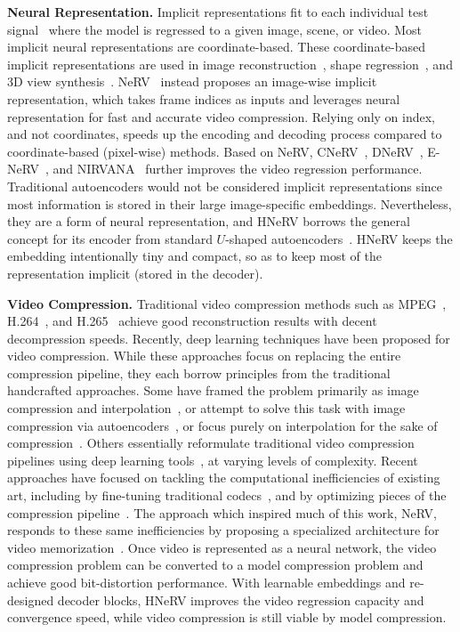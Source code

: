 \documentclass[10pt,twocolumn,letterpaper]{article}
\begin{document}
\noindent\textbf{Neural Representation.}
Implicit representations fit to each individual test signal~\cite{mehta2021modulated} where the model is regressed to a given image, scene, or video.
Most implicit neural representations are coordinate-based.
These coordinate-based implicit representations are used in image reconstruction~\cite{tancik2020fourier,sitzmann2020implicit}, shape regression~\cite{Chen_2019_CVPR,Park_2019_CVPR}, and 3D view synthesis~\cite{mildenhall2020nerf,schwarz2021graf}.
NeRV~\cite{chen2021nerv} instead proposes an image-wise implicit representation, which takes frame indices as inputs and leverages neural representation for fast and accurate video compression. 
Relying only on index, and not coordinates, speeds up the encoding and decoding process compared to coordinate-based (pixel-wise) methods. 
Based on NeRV, CNeRV~\cite{hao2022cnerv}, DNeRV~\cite{he2023dnerv}, E-NeRV~\cite{li2022enerv}, and NIRVANA~\cite{maiya2023nirvana} further improves the video regression performance.
Traditional autoencoders would not be considered implicit representations since most information is stored in their large image-specific embeddings.
Nevertheless, they are a form of neural representation, and HNeRV borrows the general concept for its encoder from standard $U$-shaped autoencoders~\cite{dct,autoencoder_08,kingma2014autoencoding,NIPS2016_eb86d510}.
HNeRV keeps the embedding intentionally tiny and compact, so as to keep most of the representation implicit (stored in the decoder).


\noindent\textbf{Video Compression.}
Traditional video compression methods such as MPEG~\cite{mpeg}, H.264~\cite{wiegand2003overview}, and H.265~\cite{hevc} achieve good reconstruction results with decent decompression speeds.
Recently, deep learning techniques have been proposed for video compression.
While these approaches focus on replacing the entire compression pipeline, they each borrow principles from the traditional handcrafted approaches.
Some have framed the problem primarily as image compression and interpolation~\cite{Wu_2018_ECCV,Djelouah_2019_ICCV}, or attempt to solve this task with image compression via autoencoders~\cite{Habibian_2019_ICCV}, or focus purely on interpolation for the sake of compression~\cite{liu2020conditional}.
Others essentially reformulate traditional video compression pipelines using deep learning tools~\cite{Rippel_2019_ICCV,liu2019neural,Agustsson_2020_CVPR}, at varying levels of complexity.
Recent approaches have focused on tackling the computational inefficiencies of existing art, including by fine-tuning traditional codecs~\cite{khani2021efficient}, and by optimizing pieces of the compression pipeline~\cite{rippel2021elfvc}.
The approach which inspired much of this work, NeRV, responds to these same inefficiencies by proposing a specialized architecture for video memorization~\cite{chen2021nerv}.
Once video is represented as a neural network, the video compression problem can be converted to a model compression problem and achieve good bit-distortion performance.
With learnable embeddings and re-designed decoder blocks, HNeRV improves the video regression capacity and convergence speed, while video compression is still viable by model compression.
\end{document}
